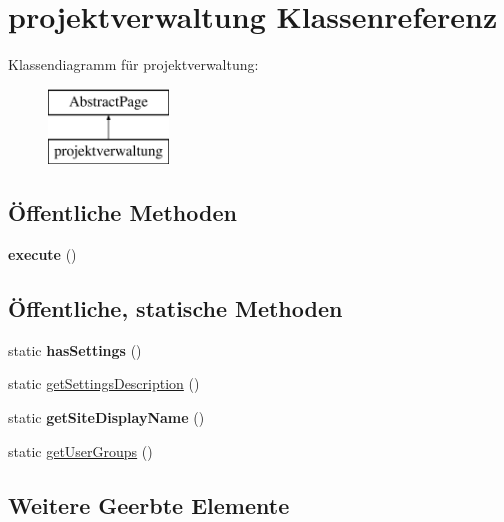 \hypertarget{classprojektverwaltung}{}\section{projektverwaltung Klassenreferenz}
\label{classprojektverwaltung}
Klassendiagramm für projektverwaltung\+:\begin{figure}[H]
\begin{center}
\leavevmode
\includegraphics[height=2.000000cm]{classprojektverwaltung}
\end{center}
\end{figure}
\subsection*{Öffentliche Methoden}
\begin{DoxyCompactItemize}
\item 
\mbox{\label{classprojektverwaltung_a13a2ab4e67f17bcd7410856467bf1aa0}} 
{\bfseries execute} ()
\end{DoxyCompactItemize}
\subsection*{Öffentliche, statische Methoden}
\begin{DoxyCompactItemize}
\item 
\mbox{\label{classprojektverwaltung_a01bfbd2d950041da1b0c0fe706e9a0f0}} 
static {\bfseries has\+Settings} ()
\item 
static \mbox{\hyperlink{classprojektverwaltung_a3320441fd0e3bf2d936778c4e7776fa9}{get\+Settings\+Description}} ()
\item 
\mbox{\label{classprojektverwaltung_a9ea0ad3ae40f1691a1627f86400297c5}} 
static {\bfseries get\+Site\+Display\+Name} ()
\item 
static \mbox{\hyperlink{classprojektverwaltung_a387d5e401120846f7040013ab7d7dc89}{get\+User\+Groups}} ()
\end{DoxyCompactItemize}
\subsection*{Weitere Geerbte Elemente}


